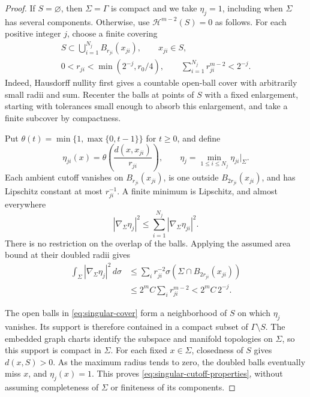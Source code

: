 \begin{proof}
If $S=\varnothing$, then $\Sigma=\Gamma$ is compact and we take
$\eta_j=1$, including when $\Sigma$ has several components.
Otherwise, use $\mathcal H^{m-2}(S)=0$ as follows.
For each
positive integer $j$, choose a finite covering
\begin{equation}
\label{eq:singular-cover}
 \begin{gathered}
 S\subset\bigcup_{i=1}^{N_j}B_{r_{ji}}(x_{ji}),
 \qquad x_{ji}\in S,\\
 0<r_{ji}<\min(2^{-j},r_0/4),
 \qquad\sum_{i=1}^{N_j}r_{ji}^{m-2}<2^{-j}.
 \end{gathered}
\end{equation}
Indeed, Hausdorff nullity first gives a countable open-ball cover
with arbitrarily small radii and sum.  Recenter the balls at points
of $S$ with a fixed enlargement, starting with tolerances small enough
to absorb this enlargement, and take a finite subcover by compactness.

Put $\theta(t)=\min\{1,\max\{0,t-1\}\}$ for $t\ge0$, and define
\[
 \eta_{ji}(x)=\theta\!\left(\frac{d(x,x_{ji})}{r_{ji}}\right),
 \qquad
 \eta_j=\min_{1\le i\le N_j}\eta_{ji}\big|_\Sigma.
\]
Each ambient cutoff vanishes on $B_{r_{ji}}(x_{ji})$, is one
outside $B_{2r_{ji}}(x_{ji})$, and has Lipschitz constant at most
$r_{ji}^{-1}$.  A finite minimum is Lipschitz, and almost everywhere
\[
 |\nabla_\Sigma\eta_j|^2
 \le\sum_{i=1}^{N_j}|\nabla_\Sigma\eta_{ji}|^2.
\]
There is no restriction on the overlap of the balls.  Applying the assumed area bound at their doubled radii gives
\begin{equation}
\label{eq:singular-cutoff-energy}
 \begin{split}
 \int_\Sigma|\nabla_\Sigma\eta_j|^2\,d\sigma
 &\le\sum_i r_{ji}^{-2}
       \sigma(\Sigma\cap B_{2r_{ji}}(x_{ji}))\\
 &\le2^m C\sum_i r_{ji}^{m-2}<2^m C\,2^{-j}.
 \end{split}
\end{equation}

The open balls in \eqref{eq:singular-cover} form a neighborhood of
$S$ on which $\eta_j$ vanishes.  Its support is therefore contained
in a compact subset of $\Gamma\setminus S$.  The embedded graph
charts identify the subspace and manifold topologies on $\Sigma$,
so this support is compact in $\Sigma$.  For each fixed
$x\in\Sigma$, closedness of $S$ gives $d(x,S)>0$.  As the maximum
radius tends to zero, the doubled balls eventually miss $x$, and
$\eta_j(x)=1$.  This proves
\eqref{eq:singular-cutoff-properties}, without assuming completeness
of $\Sigma$ or finiteness of its components.

\end{proof}

